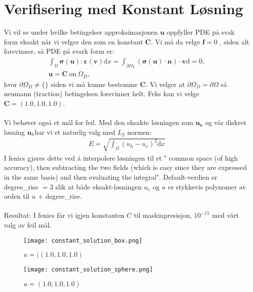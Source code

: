\documentclass[a4paper]{article}
\begin{document}
\section{Verifisering med Konstant Løsning}
Vi vil se under hvilke betingelser approksimasjonen $\boldsymbol{u}$ oppfyller PDE på svak form eksakt når vi velger den som en konstant $\boldsymbol{C}$. Vi må da velge $\boldsymbol{f}=0$ , siden alt forsvinner, så PDE på svark form er:
\begin{align*}
\int_{ \Omega} \boldsymbol{\sigma(u)}:\boldsymbol{\varepsilon(v)} \mathrm{d}x = \int_{\partial\Omega_T} (\boldsymbol{\sigma(u)}\cdot\boldsymbol{n})  \cdot \boldsymbol{v}\mathrm{d} = 0,\\
\boldsymbol{u} = \boldsymbol{C} \ \mathrm{on} \ \Omega_D,
\end{align*}
hvor $\partial\Omega_D \neq \{\}$ siden vi må kunne bestemme $\boldsymbol{C}$. Vi velger at $\partial\Omega_D = \partial\Omega$ så neumann (traction) betingelsen forsvinner helt. Feks kan vi velge $\boldsymbol{C}=(1.0,1.0,1.0)$.
\\\\
Vi behøver også et mål for feil. Med den eksakte løsningen som $\boldsymbol{u_e}$ og vår diskret løsning $\boldsymbol{u}_h$har vi et naturlig valg med $L_2$ normen:
\begin{align*}
E = \sqrt{\int_{\Omega} (u_h-u_e)^2 \mathrm{d}x}
\end{align*}
I fenics gjøres dette ved å interpolere løsningen til et " common space (of high accuracy), then subtracting the two fields (which is easy since they are expressed in the same basis) and then evaluating the integral". Default-verdien er degree\_rise $= 3$ slik at både eksakt-løsningen $u_e$ og $u$ er stykkevis polynomer av orden til $u$ + degree\_rise.
\\\\
Resultat:
I fenics får vi igjen konstanten $C$ til maskinpresisjon, $10^{-15}$ med vårt valg av feil mål.
\begin{figure}[h]
\caption{$u=((1.0,1.0,1.0)$}
\centering
\texttt{[image: constant\_solution\_box.png]}
\end{figure}
\begin{figure}[h]
\centering
\caption{$u=(1.0,1.0,1.0)$}
\texttt{[image: constant\_solution\_sphere.png]}
\end{figure}
\newpage
\end{document}
